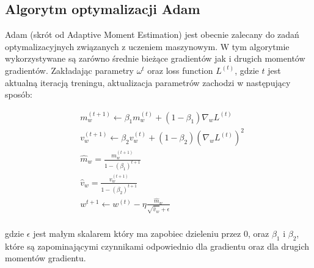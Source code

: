\subsection{Algorytm optymalizacji Adam}
Adam (skrót od Adaptive Moment Estimation) jest obecnie zalecany do zadań optymalizacyjnych związanych z uczeniem maszynowym.
W tym algorytmie wykorzystywane są zarówno średnie bieżące gradientów jak i drugich momentów gradientów.
Zakładając parametry $\omega^{t}$ oraz loss function $L^{(t)}$, gdzie $t$ jest aktualną iteracją treningu, 
aktualizacja parametrów zachodzi w następujący sposób:

\begin{align*}
  &m_w^{(t+1)} \leftarrow \beta_{1}m_w^{(t)} + (1 - \beta_1)\nabla_wL^{(t)} \\
  &v_w^{(t+1)} \leftarrow \beta_{2}v_w^{(t)} + (1 - \beta_2)(\nabla_wL^{(t)})^2 \\
  &\hat m_w = \frac{m_w^{(t+1)}}{1 - (\beta_1)^{t+1}} \\
  &\hat v_w = \frac{v_w^{(t+1)}}{1 - (\beta_2)^{t+1}} \\
  &w^{t+1} \leftarrow w^{(t)} -  \eta \frac{\hat m_w}{\sqrt{\hat v_w} + \epsilon} \\
\end{align*}

gdzie $\epsilon$ jest małym skalarem który ma zapobiec dzieleniu przez $0$, 
oraz $\beta _{1}$ i $\beta_{2}$, które są zapominającymi czynnikami odpowiednio dla gradientu oraz dla 
drugich momentów gradientu.
